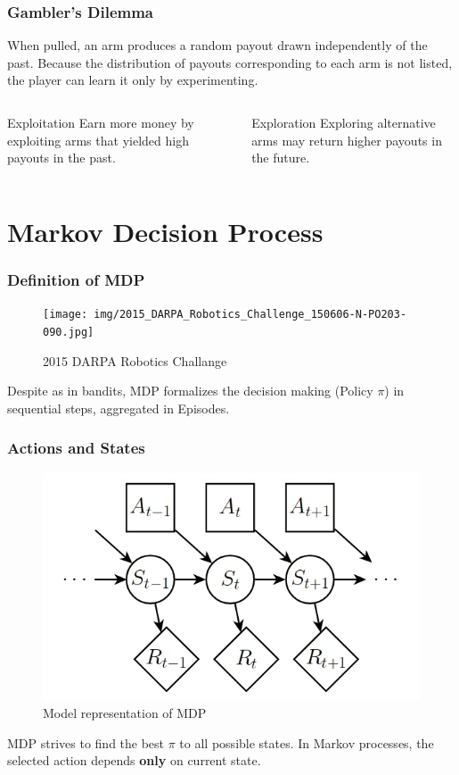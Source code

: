 \documentclass[aspectratio=169]{beamer}
\begin{document}
\begin{frame}
\frametitle{Gambler's Dilemma}
When pulled, an arm produces a random payout drawn independently of the past. Because the distribution of payouts corresponding to each arm is not listed, the player can learn it only by experimenting.
	\begin{columns}
		\begin{column}{0.5\textwidth}
			\begin{alertblock}{Exploitation}
		Earn more money by exploiting arms that yielded high payouts in the past.
			\end{alertblock}
		\end{column}
		\begin{column}{0.5\textwidth}  %
			\begin{alertblock}{Exploration}
		Exploring alternative arms may return higher payouts in the future.
			\end{alertblock}
		\end{column}
	\end{columns}
\end{frame}

\section{Markov Decision Process}
\begin{frame}
	\frametitle{Definition of MDP}
	\begin{figure}
		\texttt{[image: img/2015\_DARPA\_Robotics\_Challenge\_150606-N-PO203-090.jpg]}	
		\caption{2015 DARPA Robotics Challange \cite{mdp-robot}}
	\end{figure}
	Despite as in bandits, MDP formalizes the decision making (Policy $\pi$) in sequential steps, aggregated in Episodes. 
\end{frame}

\begin{frame}
	\frametitle{Actions and States}
	\begin{figure}
	\includegraphics[scale=0.3]{img/mdp-states.png}
	\caption{Model representation of MDP \cite{mdp-process}}
	\end{figure}
	MDP strives to find the best $\pi$ to all possible states. 
	In Markov processes, the selected action depends \textbf{only} on current state.
\end{frame}
\end{document}
